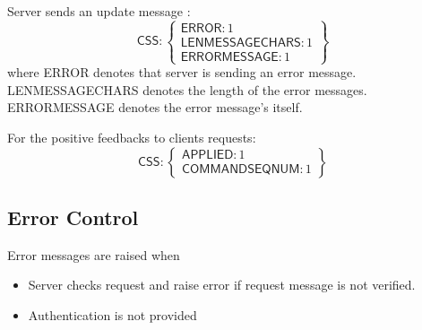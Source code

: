 Server sends an update message :
\[
\textsf{CSS}:\left\{ \begin{array}{ll}  \textsf{ERROR}:1\\
                                      \textsf{LENMESSAGECHARS}:1 \\
                                       \textsf{ERRORMESSAGE}:1 

           \end{array} \right\}
\]
where \textsf{ERROR} denotes that server is sending an error message. \textsf{LENMESSAGECHARS} denotes the length of the error messages. \textsf{ERRORMESSAGE} denotes the error message's itself.

For the positive feedbacks to clients requests:
\[\textsf{CSS} : \left\{ \begin{array}{ll}  \textsf{APPLIED}:1\\
                                             \textsf{COMMANDSEQNUM}:1
\end{array} \right\}
\]

\subsection{Error Control}
\label{sec:pdus:err}
Error messages are raised when
\begin{itemize}
\item Server checks request and raise error if request message is not verified.
\item Authentication is not provided
  \end{itemize}

